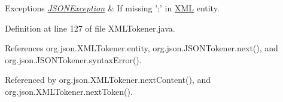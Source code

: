 \begin{DoxyExceptions}{Exceptions}
{\em \hyperlink{classorg_1_1json_1_1_j_s_o_n_exception}{J\-S\-O\-N\-Exception}} & If missing ';' in \hyperlink{classorg_1_1json_1_1_x_m_l}{X\-M\-L} entity. \\
\hline
\end{DoxyExceptions}


Definition at line 127 of file X\-M\-L\-Tokener.\-java.



References org.\-json.\-X\-M\-L\-Tokener.\-entity, org.\-json.\-J\-S\-O\-N\-Tokener.\-next(), and org.\-json.\-J\-S\-O\-N\-Tokener.\-syntax\-Error().



Referenced by org.\-json.\-X\-M\-L\-Tokener.\-next\-Content(), and org.\-json.\-X\-M\-L\-Tokener.\-next\-Token().


